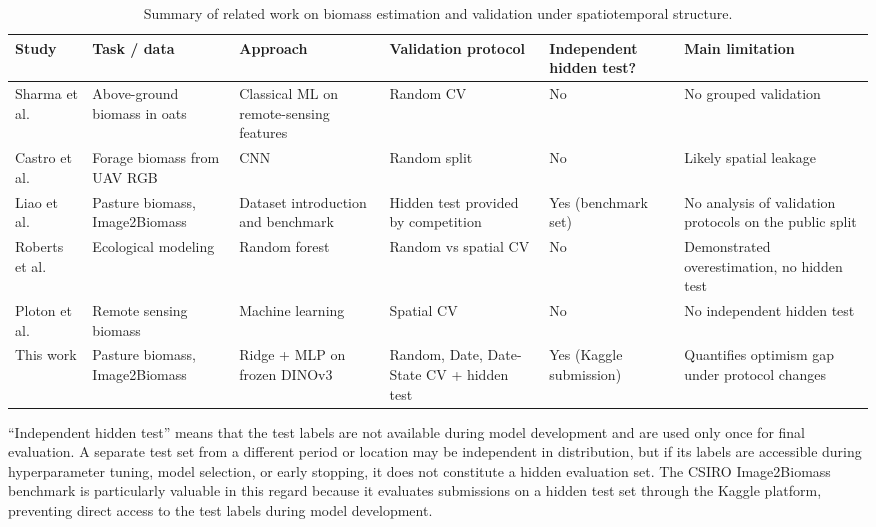 \begin{table}[htbp]
\centering
\caption{Summary of related work on biomass estimation and validation under spatiotemporal structure.}
\label{tab:related_work}
\small
\renewcommand{\arraystretch}{1.5}
\begin{threeparttable}
\begin{tabular}{p{2.0cm}p{2.5cm}p{2.8cm}p{2.6cm}p{1.8cm}p{2.5cm}}
\hline
\textbf{Study} & \textbf{Task / data} & \textbf{Approach} & \textbf{Validation protocol} & \textbf{Independent hidden test?} & \textbf{Main limitation} \\
\hline
Sharma et al.~\cite{sharma2022oats} & Above-ground biomass in oats & Classical ML on remote-sensing features & Random CV & No & No grouped validation \\
Castro et al.~\cite{castro2020deep} & Forage biomass from UAV RGB & CNN & Random split & No & Likely spatial leakage \\
Liao et al.~\cite{liao2025estimating} & Pasture biomass, Image2Biomass & Dataset introduction and benchmark & Hidden test provided by competition & Yes (benchmark set) & No analysis of validation protocols on the public split \\
Roberts et al.~\cite{roberts2017cross} & Ecological modeling & Random forest & Random vs spatial CV & No & Demonstrated overestimation, no hidden test \\
Ploton et al.~\cite{ploton2020spatial} & Remote sensing biomass & Machine learning & Spatial CV & No & No independent hidden test \\
This work & Pasture biomass, Image2Biomass & Ridge + MLP on frozen DINOv3 & Random, Date, Date-State CV + hidden test & Yes (Kaggle submission) & Quantifies optimism gap under protocol changes \\
\hline
\end{tabular}
\begin{tablenotes}
\small
\item ``Independent hidden test'' means that the test labels are not available during model development and are used only once for final evaluation. A separate test set from a different period or location may be independent in distribution, but if its labels are accessible during hyperparameter tuning, model selection, or early stopping, it does not constitute a hidden evaluation set. The CSIRO Image2Biomass benchmark is particularly valuable in this regard because it evaluates submissions on a hidden test set through the Kaggle platform, preventing direct access to the test labels during model development.
\end{tablenotes}
\end{threeparttable}
\end{table}

